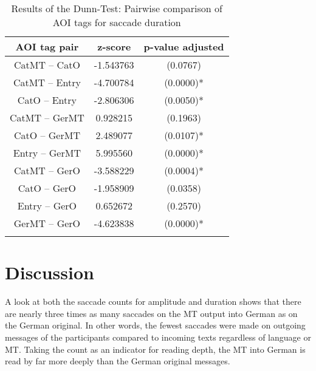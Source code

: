 \documentclass[output=paper,colorlinks,citecolor=brown]{langscibook}
\begin{document}
\begin{table}
\caption{Results of the Dunn-Test: Pairwise comparison of AOI tags for saccade duration}
\label{tab:dunntest-sacdur}
 \begin{tabularx}{.6\textwidth}{ccc}
  \lsptoprule
             AOI tag pair & z-score & p-value adjusted \\ 
  \midrule
 CatMT -- CatO  & -1.543763 & (0.0767)\\
 CatMT -- Entry &  -4.700784 &(0.0000)*\\
 CatO -- Entry  &  -2.806306 & (0.0050)*\\
 CatMT -- GerMT & 0.928215 & (0.1963)\\
 CatO -- GerMT  &  2.489077 & (0.0107)*\\
 Entry -- GerMT &  5.995560 & (0.0000)*\\
 CatMT -- GerO  & -3.588229 & (0.0004)*\\
 CatO -- GerO   & -1.958909 & (0.0358)\\
 Entry -- GerO  & 0.652672 & (0.2570)\\
 GerMT -- GerO  & -4.623838 & (0.0000)*\\
  \lspbottomrule
 \end{tabularx}
\end{table}

   

\section{Discussion}
\label{hoberg:discussion}


A look at both the saccade counts for amplitude and duration shows that there are nearly three times as many saccades on the MT output into German as on the German original. In other words, the fewest saccades were made on outgoing messages of the participants compared to incoming texts regardless of language or MT. Taking the count as an indicator for reading depth, the MT into German is read by far more deeply than the German original messages.
\end{document}
